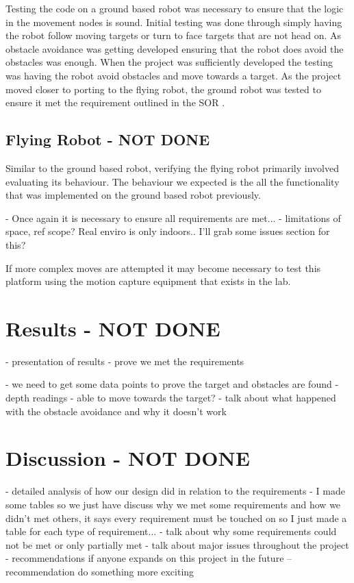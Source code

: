 \documentclass{article}
\begin{document}
	Testing the code on a ground based robot was necessary to ensure that the logic in the movement nodes is sound. Initial testing was done through simply having the robot follow moving targets or turn to face targets that are not head on. As obstacle avoidance was getting developed ensuring that the robot does avoid the obstacles was enough. When the project was sufficiently developed the testing was having the robot avoid obstacles and move towards a target. As the project moved closer to porting to the flying robot, the ground robot was tested to ensure it met the requirement outlined in the SOR \cite{sor}. 

		\subsection{Flying Robot - NOT DONE}
	
	Similar to the ground based robot, verifying the flying robot primarily involved evaluating its behaviour. The behaviour we expected is the all the functionality that was implemented on the ground based robot previously. 

- Once again it is necessary to ensure all requirements are met... 
- limitations of space, ref scope? Real enviro is only indoors.. I'll grab some issues section for this?

If more complex moves are attempted it may become necessary to test this platform using the motion capture equipment that exists in the lab.

	
\section{Results - NOT DONE}
	- presentation of results
	- prove we met the requirements

	- we need to get some data points to prove the target and obstacles are found
	- depth readings
	- able to move towards the target? 
	- talk about what happened with the obstacle avoidance and why it doesn't work


\renewcommand{\arraystretch}{2}
\section{Discussion - NOT DONE}

	- detailed analysis of how our design did in relation to the requirements
	- I made some tables so we just have discuss why we met some requirements and how we didn't met others, it says every requirement must be touched on so I just made a table for each type of requirement...
	- talk about why some requirements could not be met or only partially met
	- talk about major issues throughout the project
	- recommendations if anyone expands on this project in the future -- recommendation do something more exciting
    
\end{document}
